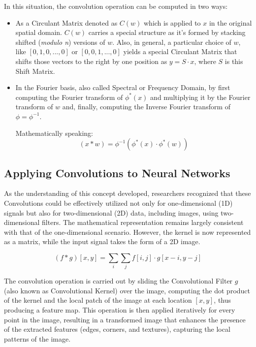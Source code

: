 In this situation, the convolution operation can be computed in two ways:
\begin{itemize}
    \item As a Circulant Matrix denoted as $C(w)$ which is applied to $x$ in the original spatial domain. $C(w)$ carries a special structure as it's formed by stacking shifted (\textit{modulo n}) versions of $w$. Also, in general, a particular choice of $w$, like $[0, 1, 0, ..., 0]$ or $[0, 0, 1, ..., 0]$ yields a special Circulant Matrix that shifts those vectors to the right by one position as $y = S \cdot x$, where $S$ is this Shift Matrix.
    \item In the Fourier basis, also called Spectral or Frequency Domain, by first computing the Fourier transform of $\phi^{*}(x)$ and multiplying it by the Fourier transform of $w$ and, finally, computing the Inverse Fourier transform of $\phi = \phi^{-1}$.

    Mathematically speaking:
    \[
        (x * w) = \phi^{-1}(\phi^{*}(x) \cdot \phi^{*}(w))
    \]
\end{itemize}

\subsection{Applying Convolutions to Neural Networks}
As the understanding of this concept developed, researchers recognized that these Convolutions could be effectively utilized not only for one-dimensional (1D) signals but also for two-dimensional (2D) data, including images, using two-dimensional filters. The mathematical representation remains largely consistent with that of the one-dimensional scenario. However, the kernel is now represented as a matrix, while the input signal takes the form of a 2D image.

\begin{center}
    \[
        (f * g)[x, y] = \sum_{i} \sum_{j} f[i, j] \cdot g[x - i, y - j]
    \]
\end{center}

The convolution operation is carried out by sliding the Convolutional Filter $g$ (also known as Convolutional Kernel) over the image, computing the dot product of the kernel and the local patch of the image at each location $[x, y]$, thus producing a feature map. This operation is then applied iteratively for every point in the image, resulting in a transformed image that enhances the presence of the extracted features (edges, corners, and textures), capturing the local patterns of the image.

